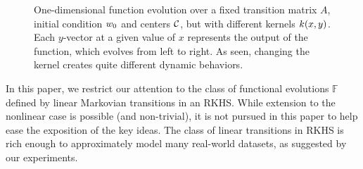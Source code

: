 \begin{figure}[t]
\centering
{}
\caption{\small{One-dimensional function evolution over a fixed transition matrix $A$, 
initial condition $w_0$ and centers $\mathcal{C}$, but with different kernels $k(x,y)$. 
Each $y$-vector at a given value of $x$ represents the output of the function, which evolves from left to right. 
As seen, changing the kernel creates quite different dynamic behaviors. }%
}
\label{fig:kernel_variation}
\end{figure}
In this paper, we restrict our attention to the class of functional evolutions $\mathbb{F}$ defined by linear Markovian transitions in an RKHS. While extension to the nonlinear case is possible (and non-trivial), it is not pursued in this paper to help ease the exposition of the key ideas. The class of linear transitions in RKHS is rich enough to approximately model many real-world datasets, as suggested by our experiments.

